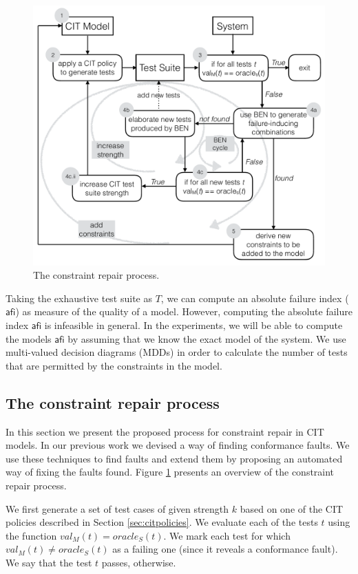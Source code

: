 \begin{tikzborder}{\cite{Gargantini16:validation}}
\begin{tikzborder}{\cite{gargantini_combinatorial_2017}}
\begin{tikzborder}{\cite{gargantini_combinatorial_2017}}
\begin{figure}[H]
	\centering
	\includegraphics[width=.7\columnwidth]{images/constraintsrepair3.pdf}
	\caption{The constraint repair process.}\label{fig:constraintsrepair}
	\label{fig:repair}
\end{figure}

\bb Taking the exhaustive test suite as $T$, we can compute an absolute failure index ($\mathsf{afi}$) as measure of the quality of a model. However, computing the absolute failure index $\mathsf{afi}$ is infeasible in general. In the experiments, we will be able to compute the models $\mathsf{afi}$ by assuming that we know the exact model of the system. We use multi-valued decision diagrams (MDDs) \cite{hvc14} in order to calculate the number of tests that are permitted by the constraints in the model.\be

\subsection{The constraint repair process}\label{sec:constr_repair}

\bb In this section we present the proposed process for constraint repair in CIT models. In our previous work \cite{Gargantini16:validation} we devised a way of finding conformance faults. We use these techniques to find faults and extend them by proposing an automated way of fixing the faults found.  
Figure \ref{fig:repair} presents an overview of the constraint repair process.


We first generate a set of test cases of given strength $k$ based on one of the CIT policies described in Section \ref{sec:citpolicies}. We evaluate each of the tests $t$ using the function $val_{M}(t)=\mathit{oracle}_{S}(t)$. We mark each test for which $val_{M}(t)\neq\mathit{oracle}_{S}(t)$ as a failing one (since it reveals a conformance fault). We say that the test $t$ passes, otherwise. 


\end{tikzborder}
\end{tikzborder}
\end{tikzborder}
